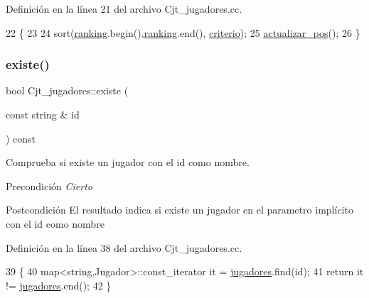 Definición en la línea 21 del archivo Cjt\+\_\+jugadores.\+cc.


\begin{DoxyCode}
22 \{
23   
24   sort(\hyperlink{class_cjt__jugadores_a2a64dd6a0c9315af038dfdb4c27da059}{ranking}.begin(),\hyperlink{class_cjt__jugadores_a2a64dd6a0c9315af038dfdb4c27da059}{ranking}.end(), \hyperlink{class_cjt__jugadores_a9aff76f40c40d4856649fa97330fd0d0}{criterio});
25   \hyperlink{class_cjt__jugadores_ac221d0fd27654e48e2c27560562a7d5a}{actualizar\_pos}();
26 \}
\end{DoxyCode}
\mbox{\label{class_cjt__jugadores_abc6937363d137e38ab7545c5f6ec7f10}} 
\subsubsection{\texorpdfstring{existe()}{existe()}}
{\footnotesize\ttfamily bool Cjt\+\_\+jugadores\+::existe (\begin{DoxyParamCaption}\item[{const string \&}]{id }\end{DoxyParamCaption}) const}



Comprueba si existe un jugador con el id como nombre. 

\begin{DoxyPrecond}{Precondición}
{\itshape Cierto} 
\end{DoxyPrecond}
\begin{DoxyPostcond}{Postcondición}
El resultado indica si existe un jugador en el parametro implícito con el id como nombre 
\end{DoxyPostcond}


Definición en la línea 38 del archivo Cjt\+\_\+jugadores.\+cc.


\begin{DoxyCode}
39 \{
40   map<string,Jugador>::const\_iterator it = \hyperlink{class_cjt__jugadores_ae3fc5f98e0f343b039bd7dff0e616ecc}{jugadores}.find(\textcolor{keywordtype}{id});
41   \textcolor{keywordflow}{return} it != \hyperlink{class_cjt__jugadores_ae3fc5f98e0f343b039bd7dff0e616ecc}{jugadores}.end();
42 \}
\end{DoxyCode}
\mbox{\label{class_cjt__jugadores_a4951d7691e67c44415fdcb3119dd4148}} 
